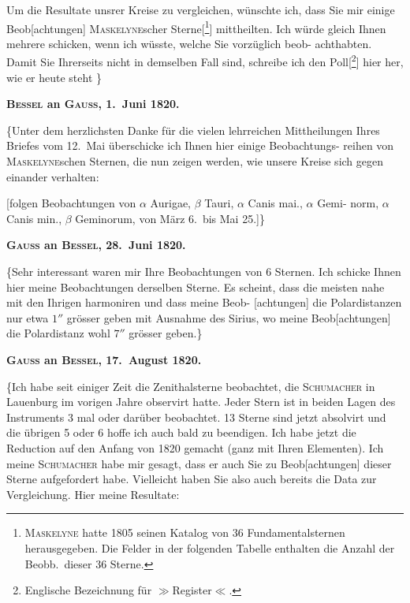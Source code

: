 \documentclass[12pt,a4paper]{article}
\theoremstyle{plain}
\theoremstyle{definition}
\theoremstyle{remark}
\begin{document}
Um die Resultate unsrer Kreise zu vergleichen, w\"{u}nschte ich, dass Sie
mir einige Beob[achtungen] \textsc{Maskelyne}scher Sterne[\footnote{\textsc{Maskelyne} hatte 1805 seinen Katalog von 36 Fundamentalsternen herausgegeben. Die Felder
in der folgenden Tabelle enthalten die Anzahl der Beobb.\ dieser 36 Sterne.}] mittheilten. Ich w\"{u}rde
gleich Ihnen mehrere schicken, wenn ich w\"{u}sste, welche Sie vorz\"{u}glich beob-
achthabten. Damit Sie Ihrerseits nicht in demselben Fall sind, schreibe
ich den Poll[\footnote{Englische Bezeichnung f\"{u}r $\gg$Register$\ll$.}] hier her, wie er heute steht
\dotfill\}

\medskip
\begin{center}
\textbf{\textsc{Bessel} an \textsc{Gauss}, 1.\ Juni 1820.}
\end{center}

\medskip
\{Unter dem herzlichsten Danke f\"{u}r die vielen lehrreichen Mittheilungen
Ihres Briefes vom 12.\ Mai \"{u}berschicke ich Ihnen hier einige Beobachtungs-
reihen von \textsc{Maskelyne}schen Sternen, die nun zeigen werden, wie unsere
Kreise sich gegen einander verhalten: \dotfill

[folgen Beobachtungen von $\alpha$ Aurigae, $\beta$ Tauri, $\alpha$ Canis mai., $\alpha$ Gemi-
norm, $\alpha$ Canis min., $\beta$ Geminorum, von M\"{a}rz 6.\ bis Mai 25.]\}

\medskip
\begin{center}
\textbf{\textsc{Gauss} an \textsc{Bessel}, 28.\ Juni 1820.}
\end{center}

\medskip
\{\dotfill Sehr interessant waren mir Ihre Beobachtungen von 6 Sternen.
Ich schicke Ihnen hier meine Beobachtungen derselben Sterne. Es scheint,
dass die meisten nahe mit den Ihrigen harmoniren und dass meine Beob-
[achtungen] die Polardistanzen nur etwa $1''$ gr\"{o}sser geben mit Ausnahme des
Sirius, wo meine Beob[achtungen] die Polardistanz wohl $7''$ gr\"{o}sser geben.\}

\medskip
\begin{center}
\textbf{\textsc{Gauss} an \textsc{Bessel}, 17.\ August 1820.}
\end{center}

\medskip
\{\dotfill Ich habe seit einiger Zeit die Zenithalsterne beobachtet, die
\textsc{Schumacher} in Lauenburg im vorigen Jahre observirt hatte. Jeder Stern ist
in beiden Lagen des Instruments 3 mal oder dar\"{u}ber beobachtet. 13 Sterne
sind jetzt absolvirt und die \"{u}brigen 5 oder 6 hoffe ich auch bald zu beendigen.
Ich habe jetzt die Reduction auf den Anfang von 1820 gemacht (ganz mit
Ihren Elementen). Ich meine \textsc{Schumacher} habe mir gesagt, dass er auch
Sie zu Beob[achtungen] dieser Sterne aufgefordert habe. Vielleicht haben
Sie also auch bereits die Data zur Vergleichung. Hier meine Resultate:
\end{document}
